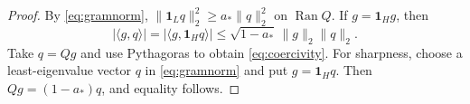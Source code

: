 \documentclass[10pt,a4paper]{amsart}
\newcommand{\astar}{a_*}
\newcommand{\one}{\mathbf 1}
\begin{document}
\begin{proof}
By \eqref{eq:gramnorm}, $\|\one_Lq\|_2^2\ge\astar\|q\|_2^2$ on $\operatorname{Ran}Q$. If $g=\one_Hg$, then
\[
 |\langle g,q\rangle|=|\langle g,\one_Hq\rangle|
 \le\sqrt{1-\astar}\,\|g\|_2\|q\|_2.
\]
Take $q=Qg$ and use Pythagoras to obtain \eqref{eq:coercivity}. For sharpness, choose a least-eigenvalue vector $q$ in \eqref{eq:gramnorm} and put $g=\one_Hq$. Then $Qg=(1-\astar)q$, and equality follows.
\end{proof}
\end{document}
